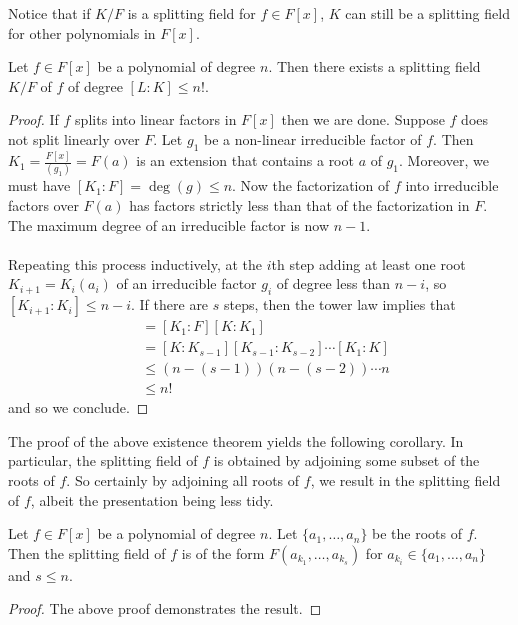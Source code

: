 \documentclass[a4paper]{article}
\begin{document}
Notice that if $K/F$ is a splitting field for $f\in F[x]$, $K$ can still be a splitting field for other polynomials in $F[x]$. 

\begin{thm}{}{} Let $f\in F[x]$ be a polynomial of degree $n$. Then there exists a splitting field $K/F$ of $f$ of degree $[L:K]\leq n!$. \tcbline
\begin{proof}
If $f$ splits into linear factors in $F[x]$ then we are done. Suppose $f$ does not split linearly over $F$. Let $g_1$ be a non-linear irreducible factor of $f$. Then $K_1=\frac{F[x]}{(g_1)}=F(a)$ is an extension that contains a root $a$ of $g_1$. Moreover, we must have $[K_1:F]=\deg(g)\leq n$. Now the factorization of $f$ into irreducible factors over $F(a)$ has factors strictly less than that of the factorization in $F$. The maximum degree of an irreducible factor is now $n-1$. \\~\\

Repeating this process inductively, at the $i$th step adding at least one root $K_{i+1}=K_i(a_i)$ of an irreducible factor $g_i$ of degree less than $n-i$, so $[K_{i+1}:K_i]\leq n-i$. If there are $s$ steps, then the tower law implies that 
\begin{align*}
[K:F]&=[K_1:F][K:K_1]\\
&=[K:K_{s-1}][K_{s-1}:K_{s-2}]\cdots[K_1:K]\\
&\leq (n-(s-1))(n-(s-2))\cdots n\\
&\leq n!
\end{align*}
and so we conclude. 
\end{proof}
\end{thm}

The proof of the above existence theorem yields the following corollary. In particular, the splitting field of $f$ is obtained by adjoining some subset of the roots of $f$. So certainly by adjoining all roots of $f$, we result in the splitting field of $f$, albeit the presentation being less tidy. 

\begin{crl}{}{} Let $f\in F[x]$ be a polynomial of degree $n$. Let $\{a_1,\dots,a_n\}$ be the roots of $f$. Then the splitting field of $f$ is of the form $F(a_{k_1},\dots,a_{k_s})$ for $a_{k_i}\in\{a_1,\dots,a_n\}$ and $s\leq n$. \tcbline
\begin{proof}
The above proof demonstrates the result. 
\end{proof}
\end{crl}
\end{document}
